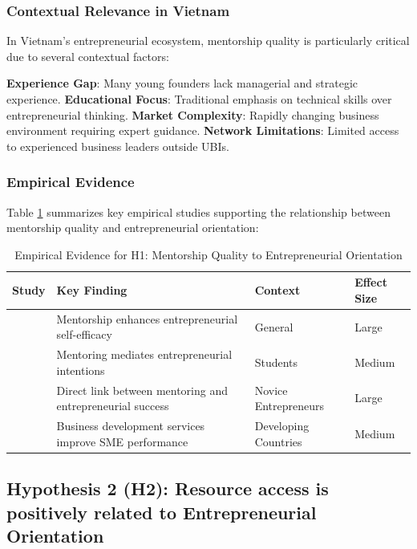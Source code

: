 \documentclass[../Main.tex]{subfiles}
\begin{document}
    \subsubsection{Contextual Relevance in Vietnam}
    In Vietnam's entrepreneurial ecosystem, mentorship quality is particularly critical due to several contextual factors:

    \textbf{Experience Gap}: Many young founders lack managerial and strategic experience. 
    \textbf{Educational Focus}: Traditional emphasis on technical skills over entrepreneurial thinking. 
    \textbf{Market Complexity}: Rapidly changing business environment requiring expert guidance. 
    \textbf{Network Limitations}: Limited access to experienced business leaders outside UBIs.

    \subsubsection{Empirical Evidence}
    Table \ref{tab:h1_evidence} summarizes key empirical studies supporting the relationship between mentorship quality and entrepreneurial orientation:

    \begin{table}[H]
        \centering
        \caption{Empirical Evidence for H1: Mentorship Quality to Entrepreneurial Orientation}
        \label{tab:h1_evidence}
        \begin{tabular}{|p{3cm}|p{4cm}|p{3cm}|p{2cm}|}
            \hline
            \textbf{Study} & \textbf{Key Finding} & \textbf{Context} & \textbf{Effect Size} \\
            \hline
            \autocite{bandura1997self} & Mentorship enhances entrepreneurial self-efficacy & General & Large \\
            \hline
            \autocite{zhao2005developing} & Mentoring mediates entrepreneurial intentions & Students & Medium \\
            \hline
            \autocite{stjean2012mentoring} & Direct link between mentoring and entrepreneurial success & Novice Entrepreneurs & Large \\
            \hline
            \autocite{sullivan2011effectiveness} & Business development services improve SME performance & Developing Countries & Medium \\
            \hline
        \end{tabular}
    \end{table}

    \subsection{Hypothesis 2 (H2): Resource access is positively related to Entrepreneurial Orientation}
\end{document}
